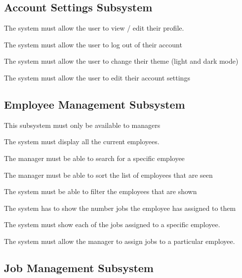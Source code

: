 \documentclass{article}
\begin{document}
	\subsection*{Account Settings Subsystem}	
	\begin{list}{R.}{}
	\item The system must allow the user to view / edit their profile.
	\item The system must allow the user to log out of their account 
	\item The system must allow the user to change their theme (light and dark mode)
	\item The system must allow the user to edit their account settings 
	
	
	\end{list}
	
	\subsection*{Employee Management Subsystem}	
	\begin{list}{R.}{}
		\item This subsystem must only be available to managers
		\item The system must display all the current employees.
		\item The manager must be able to search for a specific employee
		\item The manager must be able to sort the list of employees that are seen 
		\item The system must be able to filter the employees that are shown
		\item The system has to show the number jobs the employee has assigned to them
		\item The system must show each of the jobs assigned to a specific employee.
		\item The system must allow the manager to assign jobs to a particular employee.		
	\end{list}
	
	\subsection*{Job Management Subsystem}	
\end{document}
